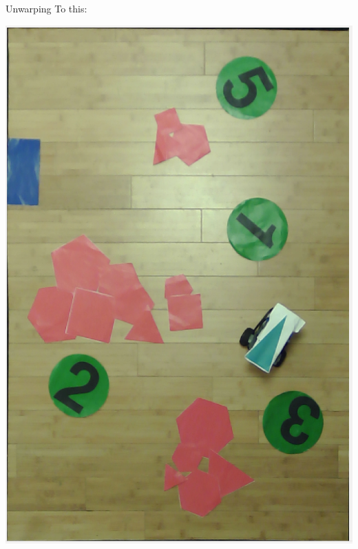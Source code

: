 \begin{frame}[fragile]{Unwarping}
To this:
	\begin{center}
		\includegraphics[scale=0.18]{Immagini/Unwrapped.png}
	\end{center}
\end{frame}

